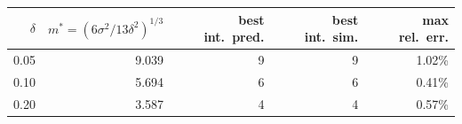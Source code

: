 \begin{tabular}{rrrrr}
\toprule
$\delta$ & $m^\ast=(6\sigma^2/13\delta^2)^{1/3}$ & best int.\ pred. & best int.\ sim. & max rel.\ err. \\
\midrule
0.05 & 9.039 & 9 & 9 & 1.02\% \\
0.10 & 5.694 & 6 & 6 & 0.41\% \\
0.20 & 3.587 & 4 & 4 & 0.57\% \\
\bottomrule
\end{tabular}
